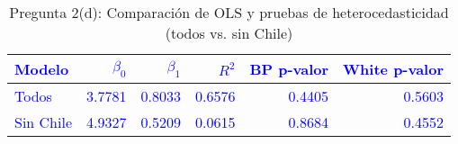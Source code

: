 \begin{table}[H]
\centering
\caption{Pregunta 2(d): Comparación de OLS y pruebas de heterocedasticidad (todos vs. sin Chile)}
\label{tab:q2d_comp}
\begin{tabular}{lrrrrr}
\rowcolor{blue!10}
\toprule
\rowcolor{blue!20}
\textcolor{blue}{\textbf{Modelo}} & \textcolor{blue}{\textbf{$\beta_0$}} & \textcolor{blue}{\textbf{$\beta_1$}} & \textcolor{blue}{\textbf{$R^2$}} & \textcolor{blue}{\textbf{BP p-valor}} & \textcolor{blue}{\textbf{White p-valor}} \\
\midrule
\rowcolor{blue!10}
\textcolor{blue}{Todos} & \textcolor{blue}{3.7781} & \textcolor{blue}{0.8033} & \textcolor{blue}{0.6576} & \textcolor{blue}{0.4405} & \textcolor{blue}{0.5603} \\
\rowcolor{blue!10}
\textcolor{blue}{Sin Chile} & \textcolor{blue}{4.9327} & \textcolor{blue}{0.5209} & \textcolor{blue}{0.0615} & \textcolor{blue}{0.8684} & \textcolor{blue}{0.4552} \\
\bottomrule
\end{tabular}
\end{table}
